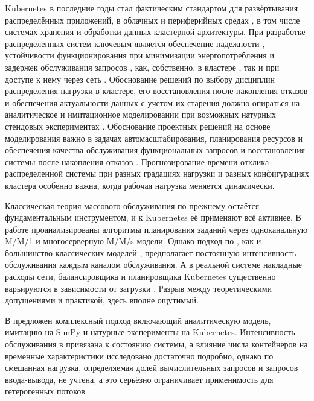 \documentclass[12pt,a4paper]{article}
\begin{document}
Kubernetes в последние годы стал фактическим стандартом для развёртывания распределённых приложений, в облачных и периферийных средах \cite{pahl2017cloud}, в том числе системах хранения и обработки данных кластерной архитектуры. При разработке распределенных систем ключевым является обеспечение надежности \cite{половко2006основы, хомоненко2018прогноз, bogatyrev2023recovery, богатырев2006комбинаторно, богатырев2007оптимальное}, устойчивости функционирования \cite{koren2020fault, tat2024designing} при минимизации энергопотребления \cite{маслова2024расчет, астахова2024энергоэффективный} и задержек обслуживания запросов \cite{dean2013tail}, как, собственно, в кластере \cite{salameh2025analytical}, так и при доступе к нему через сеть \cite{shukla2023improving}. Обоснование решений по выбору дисциплин распределения нагрузки в кластере, его восстановления после накопления отказов и обеспечения актуальности данных с учетом их старения \cite{крылов2024модель} должно опираться на аналитическое и имитационное моделировании при возможных натурных стендовых экспериментах \cite{sakellari2013survey}. Обоснование проектных решений на основе моделирования важно в задачах автомасштабирования, планирования ресурсов и обеспечения качества обслуживания функциональных запросов и восстановления системы после накопления отказов \cite{bogatyrev2023recovery, богатырев2023оценка}. Прогнозирование времени отклика распределенной системы при разных градациях нагрузки и разных конфигурациях кластера \cite{al2017elasticity} особенно важна, когда рабочая нагрузка меняется динамически.

Классическая теория массового обслуживания по-прежнему остаётся фундаментальным инструментом, и к Kubernetes её применяют всё активнее. В работе \cite{pan2024performance} проанализированы алгоритмы планирования заданий через одноканальную M/M/1 и многосерверную M/M/s модели. Однако подход по \cite{pan2024performance}, как и большинство классических моделей \cite{kleinrock1974queueing}, предполагает постоянную интенсивность обслуживания каждым каналом обслуживания. А в реальной системе накладные расходы сети, балансировщика и планировщика Kubernetes существенно варьируются в зависимости от загрузки \cite{koukis2024performance, luo2021characterizing, shahrad2020serverless}. Разрыв между теоретическими допущениями и практикой, здесь вполне ощутимый.

В \cite{фунг2024оценка} предложен комплексный подход включающий аналитическую модель, имитацию на SimPy и натурные эксперименты на Kubernetes. Интенсивность обслуживания в \cite{фунг2024оценка} привязана к состоянию системы, а влияние числа контейнеров на временные характеристики исследовано достаточно подробно, однако по \cite{фунг2024оценка} смешанная нагрузка, определяемая долей вычислительных запросов и запросов ввода-вывода, не учтена, а это серьёзно ограничивает применимость для гетерогенных потоков.
\end{document}
